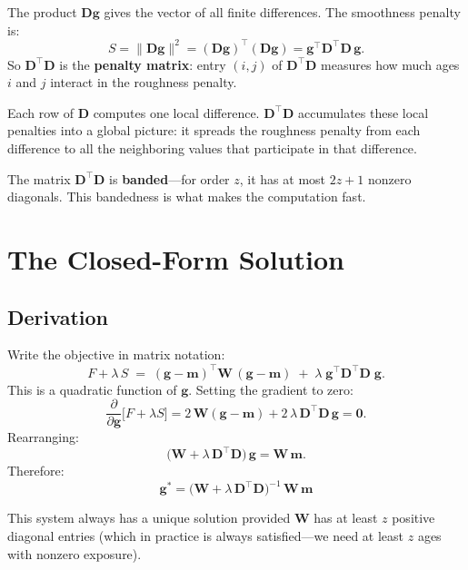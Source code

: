 \documentclass[11pt,a4paper]{article}
\begin{document}
\begin{intuition}
The product $\bm{D}\bm{g}$ gives the vector of all finite differences.  The smoothness penalty is:
\[
  S = \|\bm{D}\bm{g}\|^2 = (\bm{D}\bm{g})^\top(\bm{D}\bm{g}) = \bm{g}^\top \bm{D}^\top\bm{D}\,\bm{g}.
\]
So $\bm{D}^\top\bm{D}$ is the \textbf{penalty matrix}: entry $(i,j)$ of $\bm{D}^\top\bm{D}$ measures how much ages $i$ and $j$ interact in the roughness penalty.

Each row of $\bm{D}$ computes one local difference.  $\bm{D}^\top\bm{D}$ accumulates these local penalties into a global picture: it spreads the roughness penalty from each difference to all the neighboring values that participate in that difference.

The matrix $\bm{D}^\top\bm{D}$ is \textbf{banded}---for order $z$, it has at most $2z+1$ nonzero diagonals.  This bandedness is what makes the computation fast.
\end{intuition}

\section{The Closed-Form Solution}

\subsection{Derivation}

\begin{formaldef}
Write the objective in matrix notation:
\[
  F + \lambda\,S
  \;=\; (\bm{g} - \bm{m})^\top \bm{W}\,(\bm{g} - \bm{m})
  \;+\; \lambda\;\bm{g}^\top \bm{D}^\top\bm{D}\;\bm{g}.
\]
This is a quadratic function of $\bm{g}$.  Setting the gradient to zero:
\[
  \frac{\partial}{\partial \bm{g}}\bigl[F + \lambda S\bigr]
  = 2\,\bm{W}(\bm{g} - \bm{m}) + 2\,\lambda\,\bm{D}^\top\bm{D}\,\bm{g}
  = \bm{0}.
\]
Rearranging:
\[
  \bigl(\bm{W} + \lambda\,\bm{D}^\top\bm{D}\bigr)\,\bm{g} = \bm{W}\,\bm{m}.
\]
Therefore:
\[
  \boxed{\bm{g}^* = \bigl(\bm{W} + \lambda\,\bm{D}^\top\bm{D}\bigr)^{-1}\,\bm{W}\,\bm{m}}
\]

This system always has a unique solution provided $\bm{W}$ has at least $z$ positive diagonal entries (which in practice is always satisfied---we need at least $z$ ages with nonzero exposure).
\end{formaldef}
\end{document}

